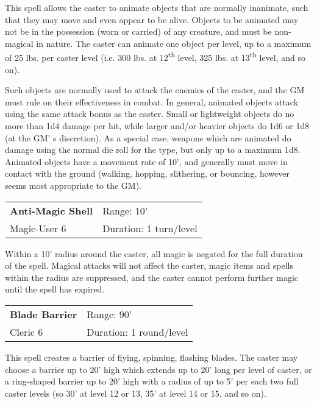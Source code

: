 \documentclass[a4paper,twoside,openany,10pt]{book}
\begin{document}
\begin{multicols}{2}
This spell allows the caster to animate objects that are normally inanimate, such that they may move and even appear to be alive. Objects to be animated may not be in the possession (worn or carried) of any creature, and must be non-magical in nature. The caster can animate one object per level, up to a maximum of 25 lbs. per caster level (i.e. 300 lbs. at 12\textsuperscript{th} level, 325 lbs. at 13\textsuperscript{th} level, and so on).

Such objects are normally used to attack the enemies of the caster, and the GM must rule on their effectiveness in combat. In general, animated objects attack using the same attack bonus as the caster. Small or lightweight objects do no more than 1d4 damage per hit, while larger and/or heavier objects do 1d6 or 1d8 (at the GM' s discretion). As a special case, weapons which are animated do damage using the normal die roll for the type, but only up to a maximum 1d8. Animated objects have a movement rate of 10', and generally must move in contact with the ground (walking, hopping, slithering, or bouncing, however seems most appropriate to the GM).

\smallskip\begin{flushleft} 
	\begin{tabularx}{0.45\textwidth}{@{}m{3.5cm}m{5.5cm}@{}} 
		\textbf{Anti-Magic Shell} & Range: 10'\\
		Magic-User 6 & Duration: 1 turn/level\\	
	\end{tabularx}\end{flushleft}


Within a 10'{} radius around the caster, all magic is negated for the full duration of the spell. Magical attacks will not affect the caster, magic items and spells within the radius are suppressed, and the caster cannot perform further magic until the spell has expired.

\smallskip\begin{flushleft} 
\begin{tabularx}{0.45\textwidth}{@{}m{3.2cm}m{5.5cm}@{}} 
\textbf{Blade Barrier} & Range: 90'\\
Cleric 6 & Duration: 1 round/level\\	
\end{tabularx}\end{flushleft}


This spell creates a barrier of flying, spinning, flashing blades. The caster may choose a barrier up to 20'{} high which extends up to 20'{} long per level of caster, or a ring-shaped barrier up to 20'{} high with a radius of up to 5'{} per each two full caster levels (so 30'{} at level 12 or 13, 35'{} at level 14 or 15, and so on).


\end{multicols}
\end{document}
